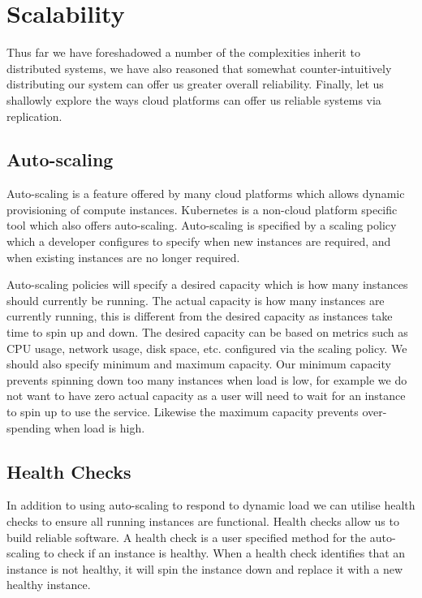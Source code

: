 \section{Scalability}
Thus far we have foreshadowed a number of the complexities inherit to distributed systems,
we have also reasoned that somewhat counter-intuitively distributing our system can offer us greater overall reliability.
Finally, let us shallowly explore the ways cloud platforms can offer us reliable systems via replication.

\subsection{Auto-scaling}
Auto-scaling is a feature offered by many cloud platforms which allows dynamic provisioning of compute instances.
Kubernetes is a non-cloud platform specific tool which also offers auto-scaling.
Auto-scaling is specified by a scaling policy which a developer configures to specify when new instances are required, and when existing instances are no longer required.

Auto-scaling policies will specify a desired capacity which is how many instances should currently be running.
The actual capacity is how many instances are currently running,
this is different from the desired capacity as instances take time to spin up and down.
The desired capacity can be based on metrics such as CPU usage, network usage, disk space, etc. configured via the scaling policy.
We should also specify minimum and maximum capacity.
Our minimum capacity prevents spinning down too many instances when load is low, 
for example we do not want to have zero actual capacity as a user will need to wait for an instance to spin up to use the service.
Likewise the maximum capacity prevents over-spending when load is high.

\subsection{Health Checks}

In addition to using auto-scaling to respond to dynamic load we can utilise health checks to ensure all running instances are functional.
Health checks allow us to build reliable software.
A health check is a user specified method for the auto-scaling to check if an instance is healthy.
When a health check identifies that an instance is not healthy, it will spin the instance down and replace it with a new healthy instance.

